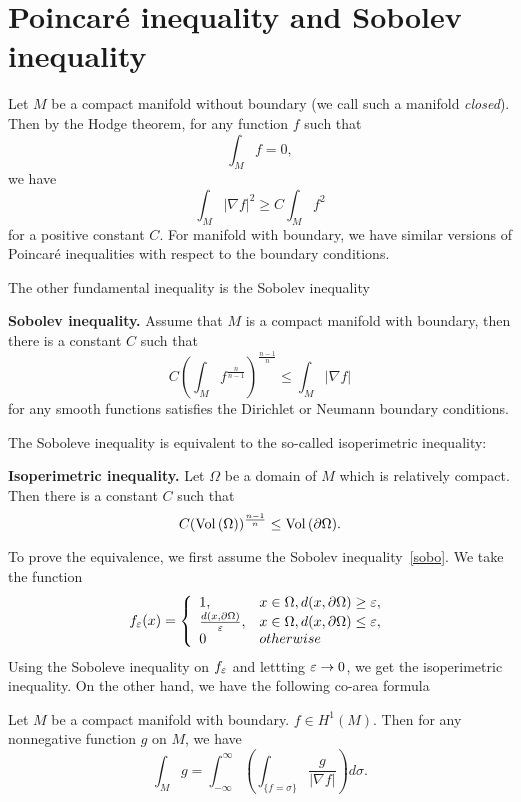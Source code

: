 \section{Poincar\'e inequality and Sobolev inequality}\label{Inequalities}
Let $M$ be a compact manifold without boundary (we call such a manifold {\it closed}). Then by the Hodge theorem, for any function $f$ such that 
\[
\int_M f=0,
\]
we have
\[
\int_M|\nabla f|^2\geq C\int_M f^2
\]
for a positive constant $C$. For manifold with boundary, we have similar versions of Poincar\'e inequalities with respect to the boundary conditions.

 The other fundamental inequality is the Sobolev inequality
 
 {\bf Sobolev inequality.} Assume that $M$ is a compact manifold with boundary, then there is a constant $C$ such that
 \begin{equation}\label{sobo}
 C\left(\int_Mf^{\frac{n}{n-1}}\right)^{\frac{n-1}n}\leq\int_M|\nabla f|
 \end{equation}
 for any smooth functions satisfies the Dirichlet or Neumann boundary conditions.
 
 
The Soboleve inequality is equivalent to the so-called isoperimetric inequality:

{\bf Isoperimetric inequality.} Let $\Omega$ be a domain of $M$ which is relatively compact. Then
there is a constant $C$ such that
\begin{equation}\label{iso}
C({\rm Vol}\,(\Omega))^{\frac{n-1}{n}}\leq{\rm Vol}\,(\partial\Omega).
\end{equation}

To prove the equivalence,
we first assume the Sobolev inequality~\eqref{sobo}. We take the function
\[
f_\varepsilon(x)=\left\{
\begin{array}{ll}
1,& x\in\Omega, d(x,\partial\Omega)\geq\varepsilon,\\
\frac{d(x,\partial\Omega)}{\varepsilon}, & x\in\Omega, d(x,\partial\Omega)\leq\varepsilon,\\
0& otherwise
\end{array}
\right.
\]
Using the Soboleve inequality on $f_\varepsilon$ and lettting $\varepsilon\to 0$, we get the isoperimetric inequality. On the other hand, we have the following co-area formula

\begin{theorem} Let $M$ be a compact manifold with boundary. $f\in H^1(M)$. Then for any nonnegative function $g$ on $M$, we have
\[
\int_M g=\int_{-\infty}^\infty\left(\int_{\{f=\sigma\}}\frac{g}{|\nabla f|}\right)d\sigma.
\]
\end{theorem}

